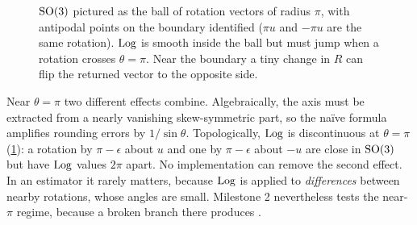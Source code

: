 \begin{figure}[t]
\centering
{}
\caption{$\mathrm{SO}(3)$ pictured as the ball of rotation vectors of radius $\pi$, with antipodal points on the
boundary identified ($\pi u$ and $-\pi u$ are the same rotation). $\operatorname{Log}$ is smooth inside the ball but
must jump when a rotation crosses $\theta = \pi$. Near the boundary a tiny change in $R$ can flip the
returned vector to the opposite side.}
\label{fig:so3-ball}
\end{figure}

\begin{remark}
Near $\theta = \pi$ two different effects combine. Algebraically, the axis must be extracted from a
nearly vanishing skew-symmetric part, so the na\"ive formula amplifies rounding errors by
$1/\sin\theta$. Topologically, $\operatorname{Log}$ is discontinuous at $\theta = \pi$ (\cref{fig:so3-ball}): a
rotation by $\pi - \epsilon$ about $u$ and one by $\pi - \epsilon$ about $-u$ are close in $\mathrm{SO}(3)$ but have
$\operatorname{Log}$ values $2\pi$ apart. No implementation can remove the second effect. In an estimator it rarely
matters, because $\operatorname{Log}$ is applied to \emph{differences} between nearby rotations, whose angles are
small. Milestone 2 nevertheless tests the near-$\pi$ regime, because a broken branch there produces
.
\end{remark}

